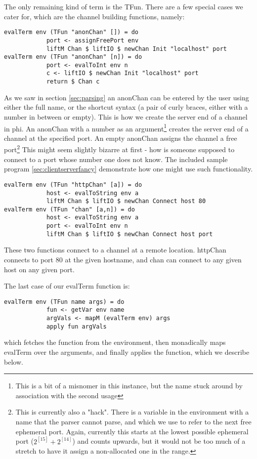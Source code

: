 The only remaining kind of term is the TFun. There are a few special cases we cater for, which are the channel building functions, namely:
\begin{verbatim}
evalTerm env (TFun "anonChan" []) = do
            port <- assignFreePort env
            liftM Chan $ liftIO $ newChan Init "localhost" port 
evalTerm env (TFun "anonChan" [n]) = do
            port <- evalToInt env n
            c <- liftIO $ newChan Init "localhost" port 
            return $ Chan c
\end{verbatim}
As we saw in section \ref{sec:parsing} an anonChan can be entered by the user using either the full name, or the shortcut syntax (a pair of curly braces, either with a number in between or empty). This is how we create the server end of a channel in phi. An anonChan with a number as an argument\footnote{This is a bit of a misnomer in this instance, but the name stuck around by association with the second usage} creates the server end of a channel at the specified port. An empty anonChan assigns the channel a free port\footnote{This is currently also a "hack". There is a variable in the environment with a name that the parser cannot parse, and which we use to refer to the next free ephemeral
port. Again, currently this starts at the lowest possible ephemeral port ($2^[15]+2^[14]$) and counts upwards, but it would not be too much of a stretch to have it assign a non-allocated one in the range.} This might seem slightly bizarre at first - how is someone supposed to connect to a port whose number one does not know. The included sample program \ref{sec:clientserverfancy} demonstrate how one might use such functionality.
\begin{verbatim}
evalTerm env (TFun "httpChan" [a]) = do
            host <- evalToString env a
            liftM Chan $ liftIO $ newChan Connect host 80
evalTerm env (TFun "chan" [a,n]) = do
            host <- evalToString env a
            port <- evalToInt env n
            liftM Chan $ liftIO $ newChan Connect host port
\end{verbatim}
These two functions connect to a channel at a remote location. httpChan connects to port 80 at the given hostname, and chan can connect to any given host on any given port.

The last case of our evalTerm function is:
\begin{verbatim}
evalTerm env (TFun name args) = do
            fun <- getVar env name
            argVals <- mapM (evalTerm env) args
            apply fun argVals
\end{verbatim}
which fetches the function from the environment, then monadically maps evalTerm over the arguments, and finally applies the function, which we describe below.

